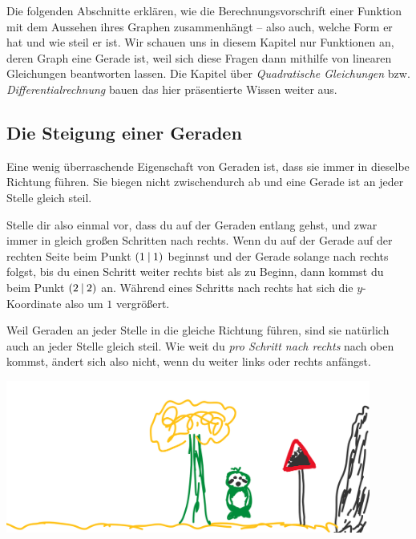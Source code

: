 \documentclass[../../main.tex]{subfiles}
\begin{document}
Die folgenden Abschnitte erklären, wie die Berechnungsvorschrift einer Funktion mit dem Aussehen ihres Graphen zusammenhängt -- also auch, welche Form er hat und wie steil er ist. Wir schauen uns in diesem Kapitel nur Funktionen an, deren Graph eine Gerade ist, weil sich diese Fragen dann mithilfe von linearen Gleichungen beantworten lassen. Die Kapitel über \emph{Quadratische Gleichungen} bzw. \emph{Differentialrechnung} bauen das hier präsentierte Wissen weiter aus.

\subsection{Die Steigung einer Geraden}


Eine wenig überraschende Eigenschaft von Geraden ist, dass sie immer in dieselbe Richtung führen. Sie biegen nicht zwischendurch ab und eine Gerade ist an jeder Stelle gleich steil.

Stelle dir also einmal vor, dass du auf der Geraden entlang gehst, und zwar immer in gleich großen Schritten nach rechts. Wenn du auf der Gerade auf der rechten Seite beim Punkt $\left(1 \:\middle|\: 1\right)$ beginnst und der Gerade solange nach rechts folgst, bis du einen Schritt weiter rechts bist als zu Beginn, dann kommst du beim Punkt $\left(2 \:\middle|\: 2\right)$ an. Während eines Schritts nach rechts hat sich die $y$-Koordinate also um $1$ vergrößert.

Weil Geraden an jeder Stelle in die gleiche Richtung führen, sind sie natürlich auch an jeder Stelle gleich steil. Wie weit du \emph{pro Schritt nach rechts} nach oben kommst, ändert sich also nicht, wenn du weiter links oder rechts anfängst.

\begin{center}
    \includegraphics[height=5cm]{images/slope.png}
\end{center}
\end{document}
